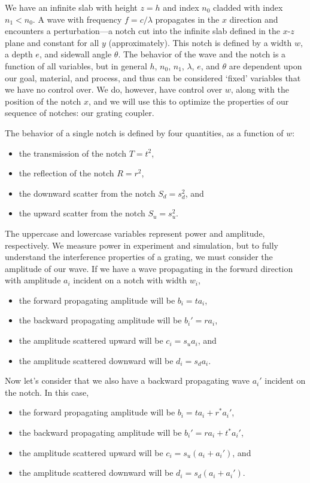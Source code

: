 \documentclass[10pt, letter, oneside,graphicx]{article}
\begin{document}
We have an infinite slab with height $z = h$ and index $n_0$ cladded with index $n_1 < n_0$. A wave with frequency $f = c/\lambda$ propagates in the $x$ direction and encounters a perturbation---a notch cut into the infinite slab defined in the $x$-$z$ plane and constant for all $y$ (approximately). This notch is defined by a width $w$, a depth $e$, and sidewall angle $\theta$. The behavior of the wave and the notch is a function of all variables, but in general $h$, $n_0$, $n_1$, $\lambda$, $e$, and $\theta$ are dependent upon our goal, material, and process, and thus can be considered `fixed' variables that we have no control over. We do, however, have control over $w$, along with the position of the notch $x$, and we will use this to optimize the properties of our sequence of notches: our grating coupler.

The behavior of a single notch is defined by four quantities, as a function of $w$: 
\begin{itemize}
\item the transmission of the notch $T = t^2$, 
\item the reflection of the notch $R = r^2$,
\item the downward scatter from the notch $S_d = s_d^2$, and 
\item the upward scatter from the notch $S_u = s_u^2$. 
\end{itemize}
The uppercase and lowercase variables represent power and amplitude, respectively. We measure power in experiment and simulation, but to fully understand the interference properties of a grating, we must consider the amplitude of our wave. If we have a wave propagating in the forward direction with amplitude $a_i$ incident on a notch with width $w_i$, 
\begin{itemize}
\item the forward propagating amplitude will be $b_i = ta_i$,
\item the backward propagating amplitude will be $b_i' = ra_i$,
\item the amplitude scattered upward will be $c_i = s_ua_i$, and
\item the amplitude scattered downward will be $d_i = s_da_i$.
\end{itemize}
Now let's consider that we also have a backward propagating wave $a_i'$ incident on the notch.
In this case,
\begin{itemize}
\item the forward propagating amplitude will be $b_i = ta_i + r^*a_i'$,
\item the backward propagating amplitude will be $b_i' = ra_i + t^*a_i'$,
\item the amplitude scattered upward will be $c_i = s_u(a_i + a_i')$, and
\item the amplitude scattered downward will be $d_i = s_d(a_i + a_i')$.
\end{itemize}
\end{document}
